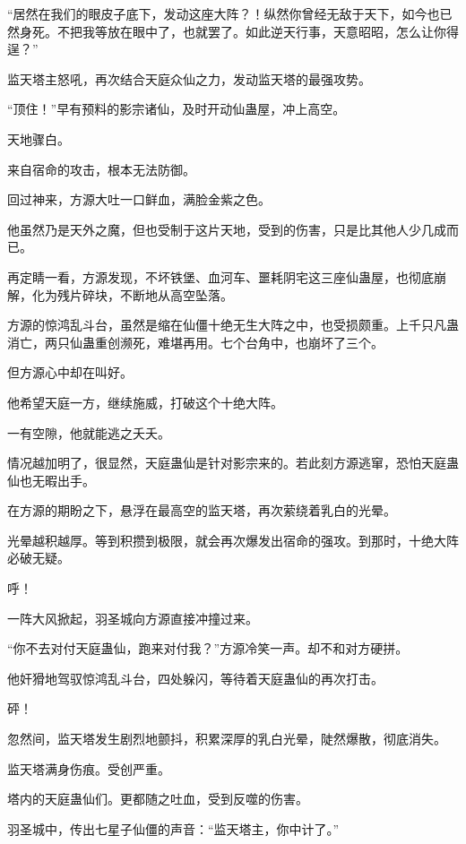 
\begin{this_body}



“居然在我们的眼皮子底下，发动这座大阵？！纵然你曾经无敌于天下，如今也已然身死。不把我等放在眼中了，也就罢了。如此逆天行事，天意昭昭，怎么让你得逞？”

监天塔主怒吼，再次结合天庭众仙之力，发动监天塔的最强攻势。

“顶住！”早有预料的影宗诸仙，及时开动仙蛊屋，冲上高空。

天地骤白。

来自宿命的攻击，根本无法防御。

回过神来，方源大吐一口鲜血，满脸金紫之色。

他虽然乃是天外之魔，但也受制于这片天地，受到的伤害，只是比其他人少几成而已。

再定睛一看，方源发现，不坏铁堡、血河车、噩耗阴宅这三座仙蛊屋，也彻底崩解，化为残片碎块，不断地从高空坠落。

方源的惊鸿乱斗台，虽然是缩在仙僵十绝无生大阵之中，也受损颇重。上千只凡蛊消亡，两只仙蛊重创濒死，难堪再用。七个台角中，也崩坏了三个。

但方源心中却在叫好。

他希望天庭一方，继续施威，打破这个十绝大阵。

一有空隙，他就能逃之夭夭。

情况越加明了，很显然，天庭蛊仙是针对影宗来的。若此刻方源逃窜，恐怕天庭蛊仙也无暇出手。

在方源的期盼之下，悬浮在最高空的监天塔，再次萦绕着乳白的光晕。

光晕越积越厚。等到积攒到极限，就会再次爆发出宿命的强攻。到那时，十绝大阵必破无疑。

呼！

一阵大风掀起，羽圣城向方源直接冲撞过来。

“你不去对付天庭蛊仙，跑来对付我？”方源冷笑一声。却不和对方硬拼。

他奸猾地驾驭惊鸿乱斗台，四处躲闪，等待着天庭蛊仙的再次打击。

砰！

忽然间，监天塔发生剧烈地颤抖，积累深厚的乳白光晕，陡然爆散，彻底消失。

监天塔满身伤痕。受创严重。

塔内的天庭蛊仙们。更都随之吐血，受到反噬的伤害。

羽圣城中，传出七星子仙僵的声音：“监天塔主，你中计了。”


\end{this_body}
